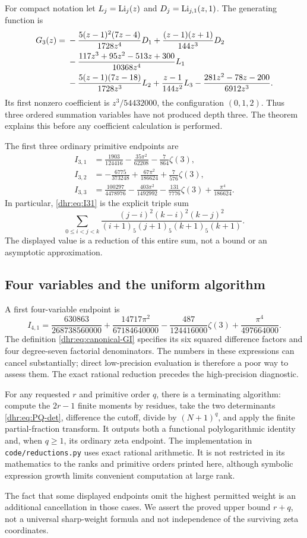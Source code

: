 For compact notation let $L_j=\operatorname{Li}_j(z)$ and
$D_j=\operatorname{Li}_{j,1}(z,1)$. The generating function is
\begin{align}
 G_3(z)={}&-\frac{5(z-1)^2(7z-4)}{1728z^4}D_1
        +\frac{(z-1)(z+1)}{144z^3}D_2\notag\\
 &-\frac{117z^3+95z^2-513z+300}{10368z^4}L_1\notag\\
 &-\frac{5(z-1)(7z-18)}{1728z^3}L_2
        +\frac{z-1}{144z^2}L_3
        -\frac{281z^2-78z-200}{6912z^3}.
 \label{dhr:eq:r3-G}
\end{align}
Its first nonzero coefficient is $z^3/54432000$, the configuration
$(0,1,2)$. Thus three ordered summation variables have not produced
depth three. The theorem explains this before any coefficient
calculation is performed.

The first three ordinary primitive endpoints are
\begin{align}
 I_{3,1}&=\frac{1903}{124416}
          -\frac{35\pi^2}{62208}-\frac7{864}\zeta(3),
 \label{dhr:eq:I31}\\
 I_{3,2}&=-\frac{6775}{373248}
          +\frac{67\pi^2}{186624}+\frac7{576}\zeta(3),
 \label{dhr:eq:I32}\\
 I_{3,3}&=\frac{100297}{4478976}
          -\frac{403\pi^2}{1492992}-\frac{131}{7776}\zeta(3)
          +\frac{\pi^4}{186624}.
 \label{dhr:eq:I33}
\end{align}
In particular, \eqref{dhr:eq:I31} is the explicit triple sum
\[
 \sum_{0\leq i<j<k}
 \frac{(j-i)^2(k-i)^2(k-j)^2}
 {(i+1)_5(j+1)_5(k+1)_5(k+1)}.
\]
The displayed value is a reduction of this entire sum, not a bound or
an asymptotic approximation.

\subsection{Four variables and the uniform algorithm}
A first four-variable endpoint is
\begin{equation}\label{dhr:eq:I41}
 I_{4,1}=\frac{630863}{268738560000}
 +\frac{14717\pi^2}{67184640000}
 -\frac{487}{124416000}\zeta(3)
 +\frac{\pi^4}{497664000}.
\end{equation}
The definition \eqref{dhr:eq:canonical-GI} specifies its six squared
difference factors and four degree-seven factorial denominators.
The numbers in these expressions can cancel substantially; direct
low-precision evaluation is therefore a poor way to assess them.
The exact rational reduction precedes the high-precision diagnostic.

For any requested $r$ and primitive order $q$, there is a terminating
algorithm: compute the $2r-1$ finite moments by residues, take the two
determinants \eqref{dhr:eq:PQ-det}, difference the cutoff, divide by
$(N+1)^q$, and apply the finite partial-fraction transform. It outputs
both a functional polylogarithmic identity and, when $q\geq1$, its
ordinary zeta endpoint. The implementation in \texttt{code/reductions.py}
uses exact rational arithmetic. It is not restricted in its mathematics
to the ranks and primitive orders printed here, although symbolic
expression growth limits convenient computation at large rank.

The fact that some displayed endpoints omit the highest permitted
weight is an additional cancellation in those cases. We assert the
proved upper bound $r+q$, not a universal sharp-weight formula and
not independence of the surviving zeta coordinates.
